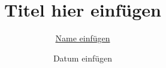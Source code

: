 \documentclass[german,12pt,twoside,a4paper]{report}%
\title{Titel hier einfügen}
\author{\href{mailto:deineemailadresse@physik.uni-muenchen.de}{Name einfügen}}
\date{Datum einfügen}
\begin{document}

\clearpage

\clearpage

\clearpage

%
\clearpage

\tableofcontents

\cleardoublepage



\begin{appendix}


\end{appendix}
\pagestyle{empty}
\cleardoublepage

\cleardoublepage

\end{document}
